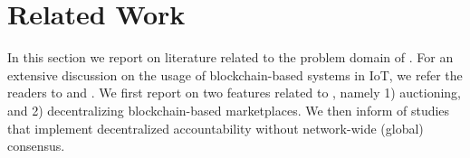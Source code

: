 
\section{Related Work}
\label{sec:related_work}
In this section we report on literature related to the problem domain of \ModelName{}. 
For an extensive discussion on the usage of blockchain-based systems in IoT, we refer the readers to \cite{christidis2016blockchains} and \cite{reyna2018blockchain}. 
We first report on two features related to \ModelName{}, namely 1) auctioning, and 2) decentralizing blockchain-based marketplaces.
We then inform of studies that implement decentralized accountability without network-wide (global) consensus.


